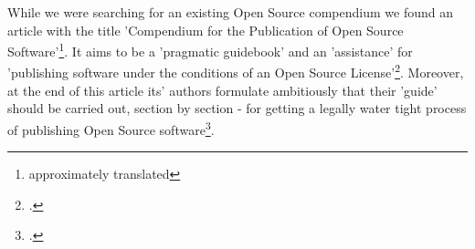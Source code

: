 %
%
%
%

%
While we were searching for an existing Open Source compendium we found an
article with the title 'Compendium for the Publication of Open Source
Software'\footnote{approximately translated}. It aims to be a 'pragmatic
guidebook' and an 'assistance' for 'publishing software under the conditions of
an Open Source License'\footcite[cf.][166f (originally: ein
\enquote{pragmatischer Ratgeber} zur \enquote{Veröffentlichung einer Software
unter den Rahmenbedingungen einer Open-Source-Lizenz}) ]{BreGlaGra2008a}.
Moreover, at the end of this article its' authors formulate ambitiously that
their 'guide' should be carried out, section by section - for getting a legally
water tight process of publishing Open Source software\footcite[cf.][186
(originally: ein \enquote{Ratgeber}, der es erlaubt \enquote{ (\ldots) die zu
berücksichtigende Aspekte (strukturiert abzuarbeiten) (\ldots) } und einen
\enquote{rechtlich nicht angreifbaren Veröffentlichungsprozess} zu
ermöglichen) ]{BreGlaGra2008a}.

